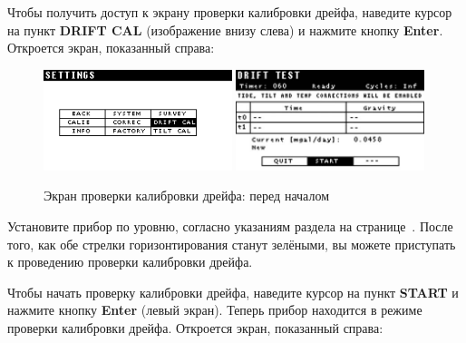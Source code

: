 
Чтобы получить доступ к экрану проверки калибровки дрейфа, наведите курсор на
пункт \textbf{DRIFT CAL} (изображение внизу слева) и нажмите кнопку
\textbf{Enter}. Откроется экран, показанный справа:

\begin{figure}[H]
  \centering
  \includegraphics[width=0.49\textwidth]{figures/the_drift_calibration_test_screen_befor_started_1}
  \includegraphics[width=0.49\textwidth]{figures/the_drift_calibration_test_screen_befor_started_2}
  \caption{Экран проверки калибровки дрейфа: перед началом}
  \label{fig:the_drift_calibration_test_screen_befor_started}
\end{figure}

Установите прибор \cg{} по уровню, согласно указаниям раздела
 на
странице~\pageref{subsec:leveling_the_cg6_autograv}. После того, как обе стрелки
горизонтирования станут зелёными, вы можете приступать к проведению проверки
калибровки дрейфа.

Чтобы начать проверку калибровки дрейфа, наведите курсор на пункт \textbf{START}
и нажмите кнопку \textbf{Enter} (левый экран). Теперь прибор \cg{} находится в
режиме проверки калибровки дрейфа. Откроется экран, показанный справа:

